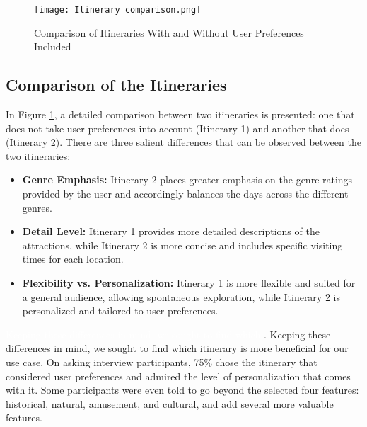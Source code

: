 \documentclass[sigconf,authordraft]{acmart}
\begin{document}

    \begin{figure}[H]
        \centering
        \texttt{[image: Itinerary comparison.png]} %
        \caption{Comparison of Itineraries With and Without User Preferences Included}
        \label{fig:itinerary_comparison}
    \end{figure}


  \subsection{Comparison of the Itineraries}

    In Figure \ref{fig:itinerary_comparison}, a detailed comparison between two itineraries is presented: one that does not take user preferences into account (Itinerary 1) and another that does (Itinerary 2). There are three salient differences that can be observed between the two itineraries:

    \begin{itemize}
    \item \textbf{Genre Emphasis:} Itinerary 2 places greater emphasis on the genre ratings provided by the user and accordingly balances the days across the different genres.

    \item \textbf{Detail Level:} Itinerary 1 provides more detailed descriptions of the attractions, while Itinerary 2 is more concise and includes specific visiting times for each location.

    \item \textbf{Flexibility vs. Personalization:} Itinerary 1 is more flexible and suited for a general audience, allowing spontaneous exploration, while Itinerary 2 is personalized and tailored to user preferences.
    \end{itemize}

    \textcolor{white}{Keeping these differences in mind, we sought to find which} 
    \vspace{16cm}
    .
     Keeping these differences in mind, we sought to find which
    itinerary is more beneficial for our use case. On asking interview participants, 75\% chose the itinerary that considered user preferences and admired the level of personalization that comes with it. Some participants were even told to go beyond the selected four features: historical, natural, amusement, and cultural, and add several more valuable features.
    \newpage
\end{document}
